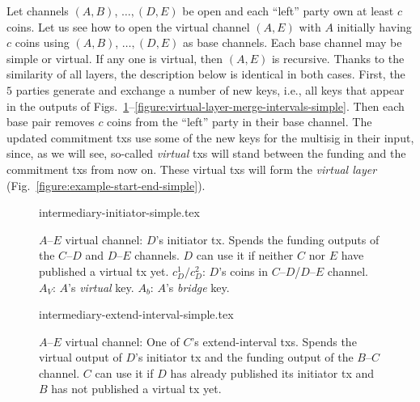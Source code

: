   Let channels $(A, B)$, $\dots,(D, E)$ be open and each ``left'' party own at
  least $c$ coins. Let us see how to open the virtual channel $(A, E)$ with $A$
  initially having $c$ coins using $(A, B)$, $\dots,(D, E)$ as base channels.
  Each base channel may be simple or virtual. If any one is virtual, then $(A,
  E)$ is recursive. Thanks to the similarity of all layers, the description
  below is identical in both cases. First, the $5$ parties generate and exchange
  a number of new
  keys, i.e., all keys that appear in the outputs of
  Figs.~\ref{figure:virtual-layer-initiator-simple}--\ref{figure:virtual-layer-merge-intervals-simple}. Then
  each base pair removes $c$ coins from the ``left'' party in
  their base channel. The updated commitment txs use some of the new
  keys for the multisig in their input, since, as we will see, so-called \emph{virtual}
  txs will stand between the funding and the commitment txs from now on. These
  virtual txs will form the \emph{virtual layer} (Fig.~\ref{figure:example-start-end-simple}).

%
  \begin{figure}[!htbp]
%
    {intermediary-initiator-simple.tex}
    \caption{$A$--$E$ virtual channel: $D$'s initiator tx. Spends the
    funding outputs of the $C$--$D$ and $D$--$E$ channels. $D$ can use it if neither
    $C$ nor $E$ have published a virtual tx yet. $c_D^1/c_D^2$: $D$'s coins
    in $C$--$D$/$D$--$E$ channel. $A_V$: $A$'s
    \emph{virtual} key. $A_b$: $A$'s \emph{bridge} key.}
    \label{figure:virtual-layer-initiator-simple}
  \end{figure}
%
%
  \begin{figure}[!htbp]
%
    {intermediary-extend-interval-simple.tex}
    \caption{$A$--$E$ virtual channel: One of $C$'s extend-interval
    txs. Spends the virtual output of $D$'s
    initiator tx and the funding output of the $B$--$C$ channel. $C$ can
    use it if $D$ has already published its initiator tx and $B$ has
    not published a virtual tx yet.}
    \label{figure:virtual-layer-extend-interval-simple}
  \end{figure}
%


